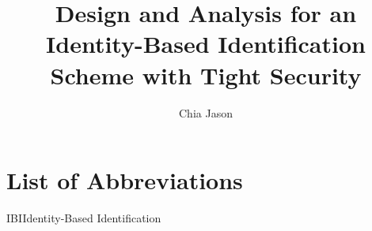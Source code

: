 \documentclass{foefyp}
\author{Chia Jason}
\title{Design and Analysis for an Identity-Based Identification Scheme with Tight Security}
\begin{document}

\frontmatter
\copyrightpage

{\clearpage\SingleSpacing
\tableofcontents\clearpage
\listoftables\clearpage
\listoffigures\clearpage
\chapter{List of Abbreviations}
IBI\quad\quad Identity-Based Identification
\clearpage
}

\mainmatter




\backmatter

\printbibliography[title=REFERENCES,heading=bibintoc]
\end{document}
